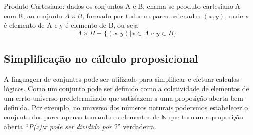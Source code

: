 \begin{center}
\end{center}


\begin{defi}
Produto Cartesiano: dados os conjuntos A e B, chama-se peoduto cartesiano A com B, ao conjunto $A\times B$, formado por todos os pares ordenados $(x,y)$, onde x é elemento de A e y é elemento de B, ou seja $$A\times B=\{(x,y)|x\in A\mbox{ e }y\in B\}$$ 
\end{defi}


\subsection{Simplificação no cálculo proposicional}
A linguagem de conjuntos pode ser utilizado para simplificar e efetuar calculos lógicos. Como um conjunto pode ser definido como a coletividade de elementos de um certo universo predeterminado que satisfazem a uma proposição aberta bem definida. Por exemplo, no universo dos números naturais poderemos estabelecer o conjunto dos pares apenas tomando os elementos de $\mathbb{N}$ que tornam a proposição aberta ``\textit{P(x):x pode ser dividido por $2$}'' verdadeira.

